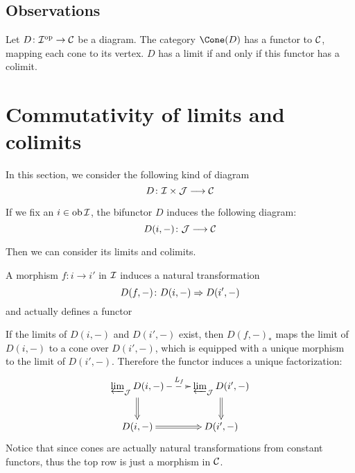 \subsection{Observations}
  \begin{ex}
    Let $D\colon{\cal I}^{\operatorname{op}}\to{\cal C}$ be a diagram. The category $\Cone(D)$ has a functor to ${\cal C}$, mapping each cone to its vertex. $D$ has a limit if and only if this functor has a colimit.
  \end{ex}

\newpage\section{Commutativity of limits and colimits}
  In this section, we consider the following kind of diagram
  \begin{equation*}
    D\colon{\cal I}\times{\cal J}\longrightarrow{\cal C}
  \end{equation*}

  If we fix an $i\in\operatorname{ob}{\cal I}$, the bifunctor $D$ induces the following diagram:
  \begin{equation*}
    D(i,-)\colon{\cal J}\longrightarrow{\cal C}
  \end{equation*}

  Then we can consider its limits and colimits.

  A morphism $f\colon i\to i'$ in ${\cal I}$ induces a natural transformation
  \begin{equation*}
    D(f,-)\colon D(i,-)\Rightarrow D(i',-)
  \end{equation*}
  and actually defines a functor

  If the limits of $D(i,-)$ and $D(i',-)$ exist, then $D(f,-)_{\ast}$ maps the limit of $D(i,-)$ to a cone over $D(i',-)$, which is equipped with a unique morphism to the limit of $D(i',-)$. Therefore the functor induces a unique factorization:
  \begin{displaymath}
    \xymatrix{
      {\invlim_{\Jj} D(i,-)}\ar@{=>}[d] \ar@{-->}[r]^{L_f} & {\invlim_{\Jj} D(i',-)}\ar@{=>}[d] \\
      D(i,-)\ar@{=>}[r] & D(i',-)
    }
  \end{displaymath}
  Notice that since cones are actually natural transformations from constant functors, thus the top row is just a morphism in ${\cal C}$.

